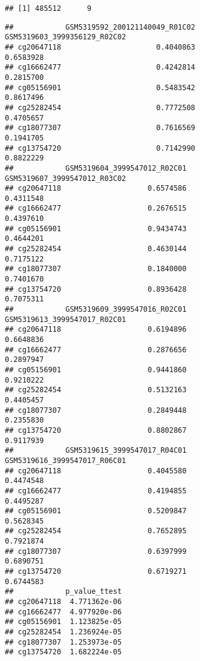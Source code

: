 \documentclass[
]{article}
\newenvironment{Shaded}{\begin{snugshade}}{\end{snugshade}}
\newcommand{\CommentTok}[1]{\textcolor[rgb]{0.56,0.35,0.01}{\textit{#1}}}
\newcommand{\FunctionTok}[1]{\textcolor[rgb]{0.13,0.29,0.53}{\textbf{#1}}}
\newcommand{\NormalTok}[1]{#1}
\newcommand{\OtherTok}[1]{\textcolor[rgb]{0.56,0.35,0.01}{#1}}
\newcommand{\SpecialCharTok}[1]{\textcolor[rgb]{0.81,0.36,0.00}{\textbf{#1}}}
\begin{document}
\begin{verbatim}
## [1] 485512      9
\end{verbatim}

\begin{Shaded}
\end{Shaded}

\begin{verbatim}
##            GSM5319592_200121140049_R01C02 GSM5319603_3999356129_R02C02
## cg20647118                      0.4040863                    0.6583928
## cg16662477                      0.4242814                    0.2815700
## cg05156901                      0.5483542                    0.8617496
## cg25282454                      0.7772508                    0.4705657
## cg18077307                      0.7616569                    0.1941705
## cg13754720                      0.7142990                    0.8822229
##            GSM5319604_3999547012_R02C01 GSM5319607_3999547012_R03C02
## cg20647118                    0.6574586                    0.4311548
## cg16662477                    0.2676515                    0.4397610
## cg05156901                    0.9434743                    0.4644201
## cg25282454                    0.4630144                    0.7175122
## cg18077307                    0.1840000                    0.7401670
## cg13754720                    0.8936428                    0.7075311
##            GSM5319609_3999547016_R02C01 GSM5319613_3999547017_R02C01
## cg20647118                    0.6194896                    0.6648836
## cg16662477                    0.2876656                    0.2897947
## cg05156901                    0.9441860                    0.9210222
## cg25282454                    0.5132163                    0.4405457
## cg18077307                    0.2849448                    0.2355830
## cg13754720                    0.8802867                    0.9117939
##            GSM5319615_3999547017_R04C01 GSM5319616_3999547017_R06C01
## cg20647118                    0.4045580                    0.4474548
## cg16662477                    0.4194855                    0.4495287
## cg05156901                    0.5209847                    0.5628345
## cg25282454                    0.7652895                    0.7921874
## cg18077307                    0.6397999                    0.6890751
## cg13754720                    0.6719271                    0.6744583
##            p_value_ttest
## cg20647118  4.771362e-06
## cg16662477  4.977920e-06
## cg05156901  1.123825e-05
## cg25282454  1.236924e-05
## cg18077307  1.253973e-05
## cg13754720  1.682224e-05
\end{verbatim}
\end{document}
